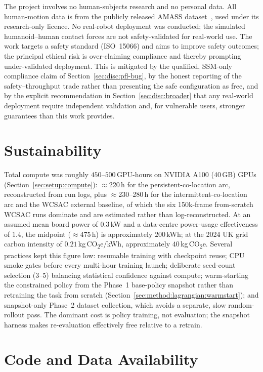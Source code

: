 \documentclass[11pt,a4paper]{report}
\newcommand{\ssm}{SSM}
\newcommand{\iso}{ISO~15066}
\begin{document}
The project involves no human-subjects research and no personal data.
All human-motion data is from the publicly released AMASS
dataset~\cite{mahmood2019amass}, used under its research-only licence. No
real-robot deployment was conducted; the simulated humanoid--human
contact forces are not safety-validated for real-world use. The work
targets a safety standard (\iso{}) and aims to improve safety outcomes;
the principal ethical risk is over-claiming compliance and thereby
prompting under-validated deployment. This is mitigated by the qualified,
\ssm{}-only compliance claim of Section~\ref{sec:disc:pfl-bug}, by the
honest reporting of the safety--throughput trade rather than presenting
the safe configuration as free, and by the explicit recommendation in
Section~\ref{sec:disc:broader} that any real-world deployment require
independent validation and, for vulnerable users, stronger guarantees
than this work provides.

\chapter{Sustainability}
\label{app:sustainability}

Total compute was roughly $450$--$500$\,GPU-hours on NVIDIA A100
(40\,GB) GPUs (Section~\ref{sec:setup:compute}): $\approx$220\,h for
the persistent-co-location arc, reconstructed from run logs, plus
$\approx$230--280\,h for the intermittent-co-location arc and the
WCSAC external baseline, of which the six 150k-frame from-scratch
WCSAC runs dominate and are estimated rather than log-reconstructed.
At an assumed mean board power of $0.3$\,kW and a data-centre
power-usage effectiveness of $1.4$, the midpoint ($\approx$475\,h) is
approximately $200$\,kWh; at the 2024 UK grid carbon intensity of
$0.21$\,kg\,CO\textsubscript{2}e/kWh, approximately
$40$\,kg\,CO\textsubscript{2}e. Several practices kept this figure low: resumable
training with checkpoint reuse; CPU smoke gates before every multi-hour
training launch; deliberate seed-count selection (3--5) balancing
statistical confidence against compute; warm-starting the constrained
policy from the Phase~1 base-policy snapshot rather than retraining the
task from scratch (Section~\ref{sec:method:lagrangian:warmstart}); and
snapshot-only Phase~2 dataset collection, which avoids a separate, slow
random-rollout pass. The dominant cost is policy training, not
evaluation; the snapshot harness makes re-evaluation effectively free
relative to a retrain.

\chapter{Code and Data Availability}
\label{app:data}
\end{document}
